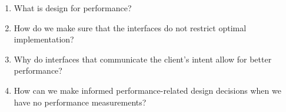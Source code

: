 \begin{enumerate}
\item 
What is design for performance?

\item 
How do we make sure that the interfaces do not restrict optimal implementation?

\item 
Why do interfaces that communicate the client's intent allow for better performance?

\item
How can we make informed performance-related design decisions when we have no performance measurements? 

\end{enumerate}